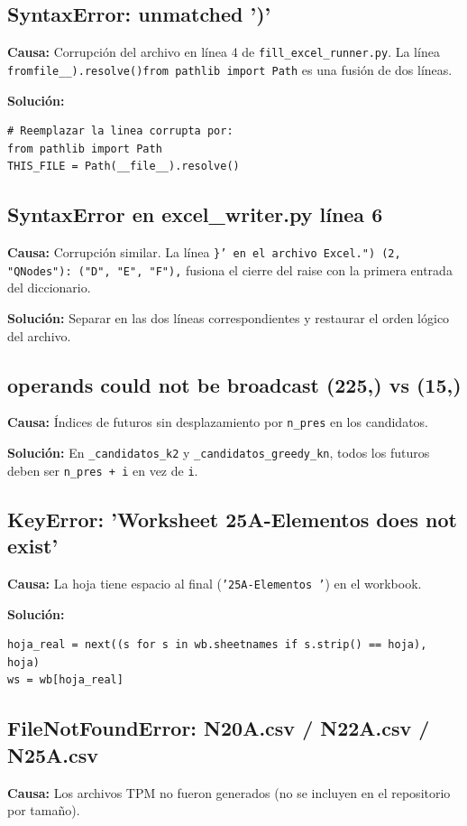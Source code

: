 \documentclass[12pt,a4paper]{article}
\begin{document}
\subsection{SyntaxError: unmatched ')'}
\textbf{Causa:} Corrupción del archivo en línea 4 de \texttt{fill\_excel\_runner.py}. La línea \texttt{fromfile\_\_).resolve()from pathlib import Path} es una fusión de dos líneas.

\textbf{Solución:}
\begin{lstlisting}
# Reemplazar la linea corrupta por:
from pathlib import Path
THIS_FILE = Path(__file__).resolve()
\end{lstlisting}

\subsection{SyntaxError en excel\_writer.py línea 6}
\textbf{Causa:} Corrupción similar. La línea \texttt{\}' en el archivo Excel.")    (2, "QNodes"): ("D", "E", "F"),} fusiona el cierre del raise con la primera entrada del diccionario.

\textbf{Solución:} Separar en las dos líneas correspondientes y restaurar el orden lógico del archivo.

\subsection{operands could not be broadcast (225,) vs (15,)}
\textbf{Causa:} Índices de futuros sin desplazamiento por \texttt{n\_pres} en los candidatos.

\textbf{Solución:} En \texttt{\_candidatos\_k2} y \texttt{\_candidatos\_greedy\_kn}, todos los futuros deben ser \texttt{n\_pres + i} en vez de \texttt{i}.

\subsection{KeyError: 'Worksheet 25A-Elementos does not exist'}
\textbf{Causa:} La hoja tiene espacio al final (\texttt{'25A-Elementos '}) en el workbook.

\textbf{Solución:}
\begin{lstlisting}
hoja_real = next((s for s in wb.sheetnames if s.strip() == hoja), hoja)
ws = wb[hoja_real]
\end{lstlisting}

\subsection{FileNotFoundError: N20A.csv / N22A.csv / N25A.csv}
\textbf{Causa:} Los archivos TPM no fueron generados (no se incluyen en el repositorio por tamaño).
\end{document}
